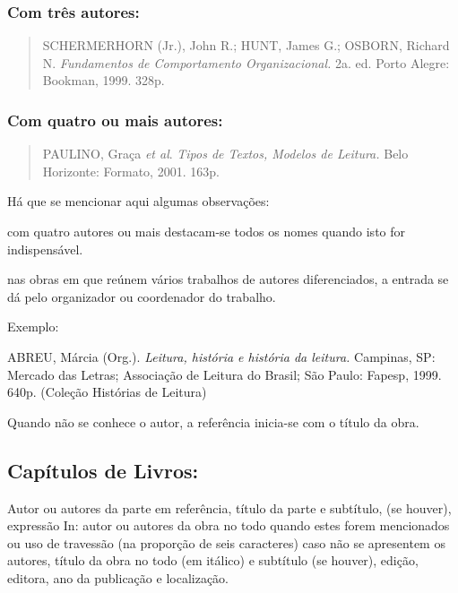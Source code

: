 \documentclass[
	12pt,				%
	openright,			%
	oneside,			%
	a4paper,			%
	english,			%
	french,				%
	spanish,			%
	brazil				%
	]{abntex2}
\begin{document}
\subsubsection{Com três autores:}
\begin{quote}
\par SCHERMERHORN (Jr.), John R.; HUNT, James G.; OSBORN, Richard N. \textit{Fundamentos de Comportamento Organizacional.} 2a. ed. Porto Alegre: Bookman, 1999. 328p.
\end{quote}

\subsubsection{Com quatro ou mais autores:}
\begin{quote}
\par PAULINO, Graça \textit{et al}. \textit{Tipos de Textos, Modelos de Leitura.} Belo Horizonte: Formato, 2001. 163p.
\end{quote}


\par Há que se mencionar aqui algumas observações: 
\begin{alineas}
\item com quatro autores ou mais destacam-se todos os nomes quando isto for indispensável. 
\item nas obras em que reúnem vários trabalhos de autores diferenciados, a entrada se dá pelo organizador ou coordenador do trabalho. 

\par Exemplo:

\par ABREU, Márcia (Org.). \textit{Leitura, história e história da leitura.} Campinas, SP: Mercado das Letras; Associação de Leitura do Brasil; São Paulo: Fapesp, 1999. 640p. (Coleção Histórias de Leitura) 

\item Quando não se conhece o autor, a referência inicia-se com o título da obra.
\end{alineas}


\subsection{Capítulos de Livros:}

\par Autor ou autores da parte em referência, título da parte e subtítulo, (se houver), expressão In: autor ou autores da obra no todo quando estes forem mencionados ou uso de travessão (na proporção de seis caracteres) caso não se apresentem os autores,  título da obra no todo (em itálico) e subtítulo (se houver), edição, editora, ano da publicação e localização.
\end{document}
